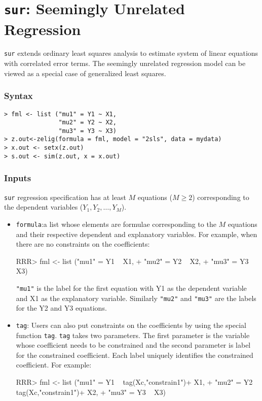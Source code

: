 \section{{\tt sur}: Seemingly Unrelated Regression}
\label{sur}

\texttt{sur} extends ordinary least squares analysis to estimate system of linear 
equations with correlated error terms. The seemingly unrelated regression model can
be viewed as a special case of generalized least squares.
\subsubsection{Syntax}
\begin{verbatim}
> fml <- list ("mu1" = Y1 ~ X1,
               "mu2" = Y2 ~ X2,
               "mu3" = Y3 ~ X3)
> z.out<-zelig(formula = fml, model = "2sls", data = mydata)
> x.out <- setx(z.out)
> s.out <- sim(z.out, x = x.out)
\end{verbatim}
\subsubsection{Inputs}
\texttt{sur} regression specification has at least $M$ equations 
($M \ge 2$) corresponding to the dependent variables ($Y_1, Y_2, \ldots, Y_M$).
\begin{itemize}
\item \texttt{formula}:a list whose elements are formulae corresponding to 
the $M$ equations and their respective dependent and explanatory variables.
For example, when there are no constraints on the coefficients:
\begin{Schunk}
\begin{Sinput}
RRR>  fml <- list ("mu1" = Y1 ~ X1,
+                "mu2" = Y2 ~ X2,
+                "mu3" = Y3 ~ X3)
\end{Sinput}
\end{Schunk}
\texttt{"mu1"} is the label for the first equation with Y1 as the dependent variable
and X1 as the explanatory variable. Similarly \texttt{"mu2"} and \texttt{"mu3"} are the
labels for the Y2 and Y3 equations.
\item \texttt{tag}: Users can also put constraints on the coefficients by using
the special function \texttt{tag}. \texttt{tag} takes two parameters. The first
parameter is the variable whose coefficient needs to be constrained and the second
parameter is label for the constrained coefficient. Each label uniquely identifies
the constrained coefficient. For example:
\begin{Schunk}
\begin{Sinput}
RRR>  fml <- list ("mu1" = Y1 ~ tag(Xc,"constrain1")+ X1,
+                "mu2" = Y2 ~ tag(Xc,"constrain1")+ X2,
+                "mu3" = Y3 ~ X3)
\end{Sinput}
\end{Schunk}
\end{itemize}
